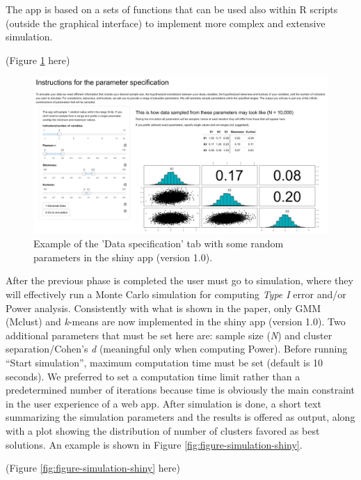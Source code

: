 \documentclass[
  man,floatsintext]{apa6}
\begin{document}
The app is based on a sets of functions that can be used also within R scripts (outside the graphical interface) to implement more complex and extensive simulation.

(Figure \ref{fig:figure-data-specification-shiny} here)

\begin{figure}

{\centering \includegraphics[width=1\linewidth]{figures_external/Figure_Data_specification_shiny} 

}

\caption{Example of the 'Data specification' tab with some random parameters in the shiny app (version 1.0).}\label{fig:figure-data-specification-shiny}
\end{figure}

After the previous phase is completed the user must go to simulation, where they will effectively run a Monte Carlo simulation for computing \emph{Type I} error and/or Power analysis. Consistently with what is shown in the paper, only GMM (Mclust) and \emph{k}-means are now implemented in the shiny app (version 1.0). Two additional parameters that must be set here are: sample size (\emph{N}) and cluster separation/Cohen's \emph{d} (meaningful only when computing Power). Before running ``Start simulation'', maximum computation time must be set (default is 10 seconds). We preferred to set a computation time limit rather than a predetermined number of iterations because time is obviously the main constraint in the user experience of a web app. After simulation is done, a short text summarizing the simulation parameters and the results is offered as output, along with a plot showing the distribution of number of clusters favored as best solutions. An example is shown in Figure \ref{fig:figure-simulation-shiny}.

(Figure \ref{fig:figure-simulation-shiny} here)
\end{document}
